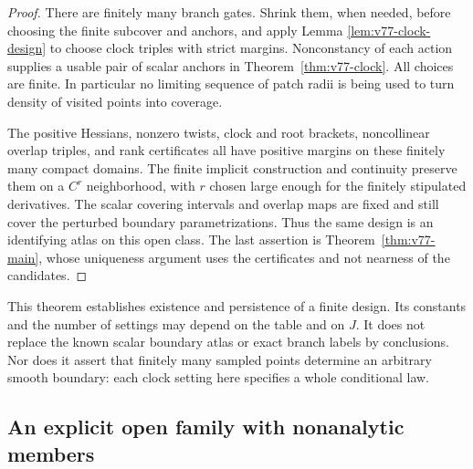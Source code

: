 \begin{proof}
There are finitely many branch gates.  Shrink them, when needed, before
choosing the finite subcover and anchors, and apply Lemma
\ref{lem:v77-clock-design} to choose clock triples with strict margins.
Nonconstancy of each action supplies a usable pair of scalar anchors
in Theorem~\ref{thm:v77-clock}.  All choices are finite.  In particular
no limiting sequence of patch radii is being used to turn density of
visited points into coverage.

The positive Hessians, nonzero twists, clock and root brackets,
noncollinear overlap triples, and rank certificates all have positive
margins on these finitely many compact domains.  The finite implicit
construction and continuity preserve them on a $C^r$ neighborhood,
with $r$ chosen large enough for the finitely stipulated derivatives.
The scalar covering intervals and overlap maps are fixed and still
cover the perturbed boundary parametrizations.  Thus the same design
is an identifying atlas on this open class.  The last assertion is
Theorem~\ref{thm:v77-main}, whose uniqueness argument uses the
certificates and not nearness of the candidates.
\end{proof}

This theorem establishes existence and persistence of a finite design.
Its constants and the number of settings may depend on the table and
on $J$.  It does not replace the known scalar boundary atlas or exact
branch labels by conclusions.  Nor does it assert that finitely many
sampled points determine an arbitrary smooth boundary: each clock
setting here specifies a whole conditional law.

\subsection{An explicit open family with nonanalytic members}

